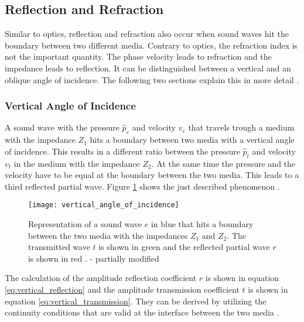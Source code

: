 \newpage
\subsection{Reflection and Refraction}
\label{subsec:Reflection_and_Refraction}
Similar to optics, reflection and refraction also occur when sound waves hit the boundary between two different media. Contrary to optics, the refraction index is not the important quantity. The phase velocity leads to refraction and the impedance leads to reflection. It can be distinguished between a vertical and an oblique angle of incidence. The following two sections explain this in more detail \cite{ultrasound}.

\subsubsection{Vertical Angle of Incidence}
\label{subsubsec:Vertical_Angle_of_Incidence}
A sound wave with the pressure $\hat{p}_e$ and velocity $v_e$ that travels trough a medium with the impedance $Z_1$ hits a boundary between two media with a vertical angle of incidence. This results in a different ratio between the pressure $\hat{p}_t$ and velocity $v_t$ in the medium with the impedance $Z_2$. At the same time the pressure and the velocity have to be equal at the boundary between the two media. This leads to a third reflected partial wave. Figure \ref{fig:vertical_angle_of_incidence} shows the just described phenomenon \cite{ultrasound}.

\begin{figure}[H]
	\centering
	\texttt{[image: vertical\_angle\_of\_incidence]}
	\caption{Representation of a sound wave $e$ in blue that hits a boundary between the two media with the impedances $Z_1$ and $Z_2$. The transmitted wave $t$ is shown in green and the reflected partial wave $r$ is shown in red \cite{ultrasound}. - partially modified}
	\label{fig:vertical_angle_of_incidence}
\end{figure}

The calculation of the amplitude reflection coefficient $r$ is shown in equation \ref{eq:vertical_reflection} and the amplitude transmission coefficient $t$ is shown in equation \ref{eq:vertical_transmission}. They can be derived by utilizing the continuity conditions that are valid at the interface between the two media \cite{ultrasound}.

